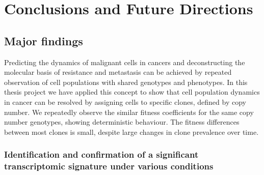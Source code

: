 
{\chapter{Conclusions and Future Directions}

}
\label{ch:Chapter6}

\section{Major findings}
Predicting the dynamics of malignant cells in cancers and deconstructing the molecular basis of resistance and metastasis can be achieved by repeated observation of cell populations with shared genotypes and phenotypes. In this thesis project we have applied this concept to show that cell population dynamics in cancer can be resolved by assigning cells to specific clones, defined by copy number. We repeatedly observe the similar fitness coefficients for the same copy number genotypes, showing deterministic behaviour. The fitness differences between most clones is small, despite large changes in clone prevalence over time.


\subsection{Identification and confirmation of a significant transcriptomic signature under various conditions}

